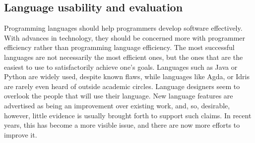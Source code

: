 
\subsection{Language usability and evaluation}
\label{sub: evaluation}


Programming languages should help programmers develop software effectively. With advances in technology, they should be concerned more with programmer efficiency rather than programming language efficiency. The most successful languages are not necessarily the most efficient ones, but the ones that are the easiest to use to satisfactorily achieve one's goals. Languages such as Java or Python are widely used, despite known flaws, while languages like Agda, or Idris are rarely even heard of outside academic circles. 
Language designers seem to overlook the people that will use their language. New language features are advertised as being an improvement over existing work, and, so, desirable, however, little evidence is usually brought forth to support such claims.
In recent years, this has become a more visible issue, and there are now more efforts to improve it. 


